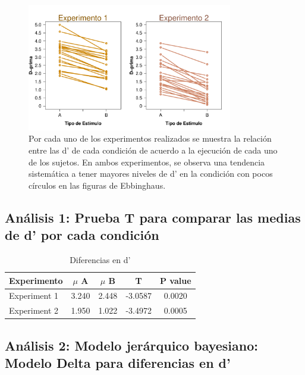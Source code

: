\begin{figure}[th]
\centering
\includegraphics[width=0.80\textwidth]{Figures/Diff_D_E1yE2}
\caption[Diferencias en Discriminabilidad (Verificando que las condiciones sean, de hecho, diferentes)]{Por cada uno de los experimentos realizados se muestra la relación entre las d' de cada condición de acuerdo a la ejecución de cada uno de los sujetos. En ambos experimentos, se observa una tendencia sistemática a tener mayores niveles de d' en la condición con pocos círculos en las figuras de Ebbinghaus.}
\label{fig:Diff_D}
\end{figure}

\subsection{Análisis 1: Prueba T para comparar las medias de d' por cada condición}

\begin{table}
\caption[Prueba T para evaluar diferencias en las medias de d' entre las condiciones]{Diferencias en d'}
\label{Tabla_t-HitsyFA}
\centering
\begin{tabular}{l | c c c c}
\toprule
\textbf{Experimento} & \textbf{$\mu$ A} & \textbf{$\mu$ B} & \textbf{T}  & \textbf{P value}\\
\midrule
Experiment 1 & 3.240 & 2.448 & -3.0587 & 0.0020 \\
Experiment 2 & 1.950 & 1.022 & -3.4972 & 0.0005 \\
\bottomrule
\end{tabular}
\end{table}


\subsection{Análisis 2: Modelo jerárquico bayesiano: Modelo Delta para diferencias en d'}

